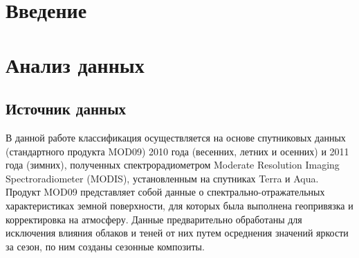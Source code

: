 \documentclass[14pt, a4paper, oneside]{extarticle}
\begin{document}
\tableofcontents
\newpage

\section{Введение}




\newpage

\section{Анализ данных}
\subsection{Источник данных}
В данной работе классификация осуществляется на основе спутниковых данных (стандартного продукта MOD09) 2010 года (весенних, летних и осенних) и 2011 года (зимних), полученных спектрорадиометром Moderate Resolution Imaging Spectroradiometer (MODIS), установленным на спутниках Terra и Aqua. Продукт MOD09 представляет собой данные о спектрально-отражательных характеристиках земной поверхности, для которых была выполнена геопривязка и корректировка на атмосферу. Данные предварительно обработаны для исключения влияния облаков и теней от них путем осреднения значений яркости за сезон, по ним созданы сезонные композиты.
\end{document}
